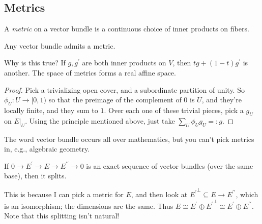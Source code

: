 \subsection{Metrics}
A \emph{metric} on a vector bundle is a continuous choice of inner products on fibers.
\begin{lemma}
    Any vector bundle admits a metric.
\end{lemma}
Why is this true? If $g,g^\prime$ are both inner products on $V$, then $tg+(1-t)g^\prime$ is another. The space of metrics forms a real affine space. 
\begin{proof}
    Pick a trivializing open cover, and a subordinate partition of unity. So $\phi_U:U\to [0,1)$ so that the preimage of the complement of $0$ is $U$, and they're locally finite, and they sum to $1$. Over each one of these trivial pieces, pick a $g_U$ on $E|_{U}$. Using the principle mentioned above, just take $\sum_{U}\phi_U g_U=:g$.
\end{proof}
The word vector bundle occurs all over mathematics, but you can't pick metrics in, e.g., algebraic geometry.
\begin{corollary}
    If $0\to E^\prime\to E\to E^{\prime\prime}\to 0$ is an exact sequence of vector bundles (over the same base), then it splits.
\end{corollary}
This is because I can pick a metric for $E$, and then look at ${E^\prime}^\perp\subseteq E\to E^{\prime\prime}$, which is an isomorphism; the dimensions are the same. Thus $E\cong E^\prime\oplus {E^\prime}^{\perp}\cong E^\prime\oplus E^{\prime\prime}$. Note that this splitting isn't natural!
